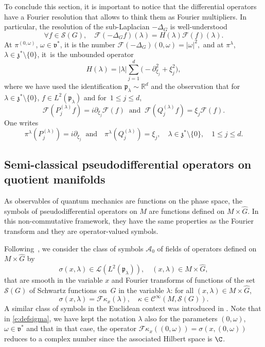 \documentclass[10pt]{amsart}
\let\mathcal\mathscr
\theoremstyle{plain}
\theoremstyle{definition}
\def\R{{\mathbb R}}
\let\Subsection\subsection\let\Subsubsection\subsubsection
\begin{document}
To conclude this section, it is important to notice that the differential operators have a Fourier resolution that allows to think them as Fourier multipliers. In particular, the resolution of the sub-Laplacian $-\Delta_G$ is well-understood
\[
\forall f\in{\mathcal S}(G),\quad \mathcal F(-\Delta_G f)(\lambda)= H(\lambda) {\mathcal F} (f) (\lambda).
\]
At $\pi^{(0,\omega)}$, $\omega\in{\mathfrak v}^*$, it is the number
${\mathcal F} (-\Delta_G)(0,\omega) = |\omega|^2,$
and at $\pi^\lambda$, $\lambda\in{\mathfrak z}^*\setminus\{0\}$, it~is the unbounded operator
\begin{equation}\label{def:H}
H(\lambda)=|\lambda| \sum_{ j=1}^{d} \bigl(-\partial_{\xi_j}^2+\xi_j^2\bigr),
\end{equation}
where we have used the identification $\mathfrak p_\lambda\!\sim\! \R^d$ and the observation that for \hbox{$\lambda\!\in\!\mathfrak z^*\!\setminus\!\{0\}$}, $ f\in L^2(\mathfrak p_\lambda)$ and for~$1\leq j\leq d$,
\[
\mathcal F (P^{(\lambda)}_jf)=i\partial_{\xi_j}\mathcal F(f) \; \;\mbox{and}\; \;\mathcal F(Q^{(\lambda)}_jf)=\xi_j\mathcal F(f).
\]
One writes
\begin{equation}\label{calcul:pi(P)}
\pi^\lambda(P^{(\lambda)}_j)=i\partial_{\xi_j} \; \;\mbox{and}\quad \pi^\lambda(Q^{(\lambda)}_j)=\xi_j,\quad \lambda\in\mathfrak z^*\setminus\{0\},\quad 1\leq j\leq d.
\end{equation}

\Subsection{Semi-classical pseudodifferential operators on quotient manifolds} \label{sec:semiclassic}
As observables of quantum mechanics are functions on the phase space, the symbols of pseudodifferential operators on $M$ are functions defined on $M\times \widehat{G}$. In this non-commutative framework, they have the same properties as the Fourier transform and they are operator-valued symbols.

Following~\cite{FF,FF1}, we consider the class of symbols ${{\mathcal A}_0}$ of fields of operators defined on $M\times \widehat G$ by
\[
\sigma(x,\lambda)\in{\mathcal L}(L^2(\mathfrak p_\lambda)),\quad (x,\lambda)\in M\times \widehat G,
\]
that are smooth in the variable $x$ and Fourier transforms of functions of the set~${\mathcal S}(G)$ of Schwartz functions on~$G$
in the variable $\lambda$: for all $(x,\lambda)\in M\times \widehat G$,
\begin{equation}\label{e:defsigma}
\sigma(x,\lambda) = {\mathcal F} \kappa_x (\lambda),\quad \kappa\in\mathcal C^\infty(M,\mathcal S(G)).
\end{equation}
A similar class of symbols in the Euclidean context was introduced in \cite[\S 3]{LP93}.
Note that in \eqref{e:defsigma}, we have kept the notation $\lambda$ also for the parameters $(0,\omega)$, $\omega\in\mathfrak v^*$ and that in that case, the operator ${\mathcal F} \kappa_x ((0,\omega))=\sigma(x,(0,\omega))$ reduces to a complex number since the associated Hilbert space is $\C$.
\end{document}

